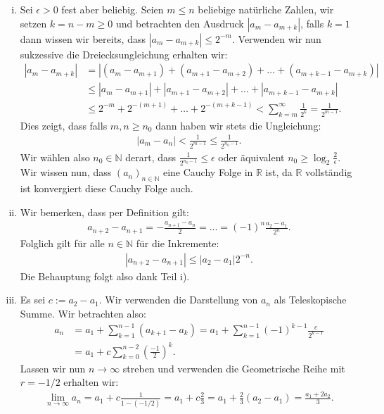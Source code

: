 \documentclass[a4paper, 20]{exam}
\begin{document}
\begin{solution}
\begin{enumerate}[i)]
\item Sei $ \epsilon >0$ fest aber beliebig. Seien $m \leq n$ beliebige natürliche Zahlen, wir setzen $k= n-m \geq 0$ und betrachten den Ausdruck $|a_m-a_{m+k}|$, falls $k=1$ dann wissen wir bereits, dass $|a_m-a_{m+k}| \leq 2^{-m}$. Verwenden wir nun sukzessive die Dreiecksungleichung erhalten wir:
\begin{align*}
|a_m-a_{m+k}| &= |(a_m-a_{m+1}) + (a_{m+1}-a_{m+2}) + \dots + (a_{m+k-1}-a_{m+k})| \\
& \leq |a_m-a_{m+1}| + |a_{m+1}-a_{m+2}| + \dots + |a_{m+k-1}-a_{m+k}|\\
& \leq 2^{-m} + 2^{-(m+1)} + \dots + 2^{-(m+k-1)} < \sum_{k=m}^\infty \frac{1}{2^k} = \frac{1}{2^{m-1}}.
\end{align*}
Dies zeigt, dass falls $m,n \geq n_0$ dann haben wir stets die Ungleichung:
\begin{align*}
|a_m-a_n| < \frac{1}{2^{m-1}} \leq \frac{1}{2^{n_0-1}}.
\end{align*}
Wir wählen also $n_0 \in \mathbb{N}$ derart, dass $\frac{1}{2^{n_0-1}} \leq \epsilon$ oder äquivalent $n_0 \geq \log_2 \frac{2}{\epsilon}$. Wir wissen nun, dass $(a_n)_{n \in \mathbb{N}}$ eine Cauchy Folge in $\mathbb{R}$ ist, da $\mathbb{R}$ vollständig ist konvergiert diese Cauchy Folge auch. 

\item Wir bemerken, dass per Definition gilt:
\begin{align*}
a_{n+2}-a_{n+1} = - \frac{a_{n+1}-a_n}{2} = \dots = (-1)^n  \frac{a_2-a_1}{2^n}.
\end{align*}
Folglich gilt für alle $n \in \mathbb{N}$ für die Inkremente:
\begin{align*}
|a_{n+2}-a_{n+1}| \leq |a_2-a_1| 2^{-n}.
\end{align*}
Die Behauptung folgt also dank Teil i). 

\item Es sei $c:= a_2-a_1$. Wir verwenden die Darstellung von $a_n$ als Teleskopische Summe. Wir betrachten also:
\begin{align*}
a_n  &= a_1 + \sum_{k=1}^{n-1} (a_{k+1}-a_k) = a_1 + \sum_{k=1}^{n-1} (-1)^{k-1} \frac{c}{2^{k-1}} \\
& = a_1 + c\sum_{k=0}^{n-2} \left( \frac{-1}{2} \right)^k.
\end{align*}
Lassen wir nun $n \longrightarrow \infty$ streben und verwenden die Geometrische Reihe mit $r= -1/2$ erhalten wir:
\begin{align*}
\lim_{n \rightarrow \infty} a_n = a_1 + c \frac{1}{1-(-1/2)} = a_1 + c \frac{2}{3} = a_1 + \frac{2}{3}(a_2-a_1) = \frac{a_1+2a_2}{3}.
\end{align*}
\end{enumerate}

\end{solution}
\end{document}
